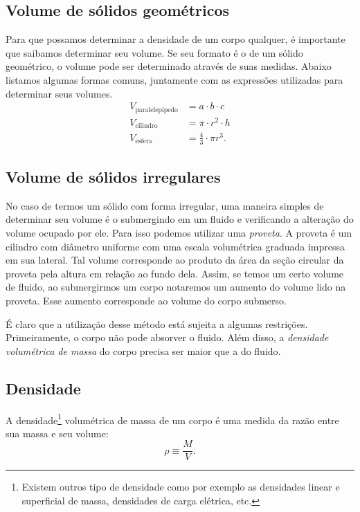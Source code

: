 \subsection{Volume de sólidos geométricos}

Para que possamos determinar a densidade de um corpo qualquer, é importante que saibamos determinar seu volume. Se seu formato é o de um sólido geométrico, o volume pode ser determinado através de suas medidas. Abaixo listamos algumas formas comuns, juntamente com as expressões utilizadas para determinar seus volumes.
\begin{align}
    V_{\text{paralelepípedo}} &= a \cdot b \cdot c \\
    V_{\text{cilindro}} &= \pi \cdot r^2 \cdot h \\
    V_{\text{esfera}} &= \frac{4}{3} \cdot \pi r^3.
\end{align}

\subsection{Volume de sólidos irregulares}

No caso de termos um sólido com forma irregular, uma maneira simples de determinar seu volume é o submergindo em um fluido e verificando a alteração do volume ocupado por ele. Para isso podemos utilizar uma \emph{proveta}. A proveta é um cilindro com diâmetro uniforme com uma escala volumétrica graduada impressa em sua lateral. Tal volume corresponde ao produto da área da seção circular da proveta pela altura em relação ao fundo dela. Assim, se temos um certo volume de fluido, ao submergirmos um corpo notaremos um aumento do volume lido na proveta. Esse aumento corresponde ao volume do corpo submerso.

É claro que a utilização desse método está sujeita a algumas restrições. Primeiramente, o corpo não pode absorver o fluido. Além disso, a \emph{densidade volumétrica de massa} do corpo precisa ser maior que a do fluido.

\subsection{Densidade}

A densidade\footnote{Existem outros tipo de densidade como por exemplo as densidades linear e superficial de massa, densidades de carga elétrica, etc.} volumétrica de massa de um corpo é uma medida da razão entre sua massa e seu volume:
\begin{equation}
    \rho \equiv \frac{M}{V}.
\end{equation}

